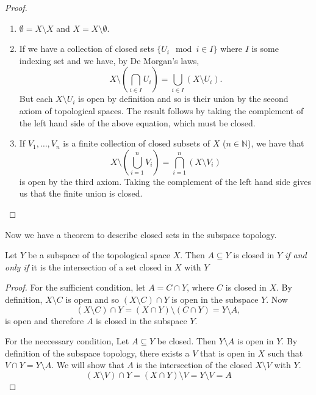 \begin{proof}
  \begin{enumerate}
  \item $\emptyset = X \setminus X$ and $X = X \setminus \emptyset$.
  \item If we have a collection of closed sets $\{ U_i \mod i \in I
    \}$ where $I$ is some indexing set and we have, by De Morgan's
    laws,
    \[
      X \setminus \left( \bigcap_{i \in I}U_i \right) = \bigcup_{i \in I} (X
      \setminus U_i).
    \]
    But each $X \setminus U_i$ is open by definition and so is their
    union by the second axiom of topological spaces. The result
    follows by taking the complement of the left hand side of the
    above equation, which must be closed.
  \item If $V_1, \dots, V_n$ is a finite collection of closed subsets
    of $X$ ($n \in \mathbb{N}$), we have that
    \[
      X \setminus \left( \bigcup_{i=1}^n V_i \right) = \bigcap_{i =
        1}^n (X \setminus V_i)
    \]
    is open by the third axiom. Taking the complement of the left hand
    side gives us that the finite union is closed.
  \end{enumerate}
\end{proof}

Now we have a theorem to describe closed sets in the subspace
topology.

\begin{thm}
  \label{thm:closed-in-subspace}
  Let $Y$ be a subspace of the topological space $X$. Then $A
  \subseteq Y$ is closed in $Y$ \emph{if and only if} it is the
  intersection of a set closed in $X$ with $Y$
\end{thm}

\begin{proof}
  For the sufficient condition, let $A = C \cap Y$, where $C$ is
  closed in $X$. By definition, $X \setminus C$ is open and so $(X
  \setminus C) \cap Y$ is open in the subspace $Y$. Now
  \[
    (X \setminus C) \cap Y = (X \cap Y) \setminus (C \cap Y) = Y
    \setminus A,
  \]
  is open and therefore $A$ is closed in the subspace $Y$.

  For the neccessary condition, Let $A \subseteq Y$ be closed. Then $Y
  \setminus A$ is open in $Y$. By definition of the subspace topology,
  there exists a $V$ that is open in $X$ such that $V \cap Y = Y
  \setminus A$. We will show that $A$ is the intersection of the
  closed $X \setminus V$ with $Y$.
  \[
    (X \setminus V) \cap Y = (X \cap Y) \setminus V = Y \setminus V = A
  \]
\end{proof}

